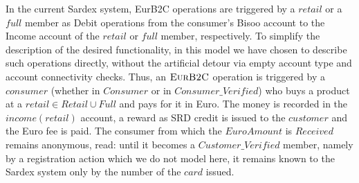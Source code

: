 In the current Sardex system, EurB2C operations are triggered by a $retail$ or a $full$ member as Debit operations from the consumer's Bisoo account to the Income account of the $retail$ or $full$ member, respectively. To simplify the description of the desired functionality, in this model we have chosen to describe such operations directly, without the artificial detour via empty account type and account connectivity checks. Thus, an $\hbox{\sc EurB2C}$ operation is triggered by a $consumer$ (whether in $Consumer$ or in $Consumer\_Verified$) who buys a product at a $retail \in Retail \cup Full$ and pays for it in Euro. The money is recorded in the $income(retail)$ account, a reward as SRD credit is issued to the $customer$ and the Euro fee is paid. The consumer from which the $EuroAmount$ is $Received$ remains anonymous, read: until it becomes a $Customer\_Verified$ member, namely by a registration action which we do not model here, it remains known to the Sardex system only by the number of the $card$ issued.

